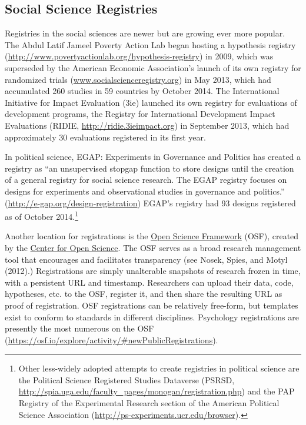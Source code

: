 \documentclass[12pt] {article}
\begin{document}
\subsection{Social Science Registries}\label{social-science-registries}

Registries in the social sciences are newer but are growing ever more
popular. The Abdul Latif Jameel Poverty Action Lab began hosting a
hypothesis registry
(\url{http://www.povertyactionlab.org/hypothesis-registry}) in 2009,
which was superseded by the American Economic Association's launch of
its own registry for randomized trials
(\href{http://www.socialscienceregistry.org}{www.socialscienceregistry.org})
in May 2013, which had accumulated 260 studies in 59 countries by
October 2014. The International Initiative for Impact Evaluation (3ie)
launched its own registry for evaluations of development programs, the
Registry for International Development Impact Evaluations (RIDIE,
\url{http://ridie.3ieimpact.org}) in September 2013, which had
approximately 30 evaluations registered in its first year.

In political science, EGAP: Experiments in Governance and Politics has
created a registry as ``an unsupervised stopgap function to store
designs until the creation of a general registry for social science
research. The EGAP registry focuses on designs for experiments and
observational studies in governance and politics.''
(\url{http://e-gap.org/design-registration}) EGAP's registry had 93
designs registered as of October 2014.\footnote{Other less-widely
  adopted attempts to create registries in political science are the
  Political Science Registered Studies Dataverse (PSRSD,
  \href{../customXml/item1.xml}{http://spia.uga.edu/faculty\_pages/monogan/registration.php})
  and the PAP Registry of the Experimental Research section of the
  American Political Science Association
  (\href{numbering.xml}{http://ps-experiments.ucr.edu/browser}).}

Another location for registrations is the \href{http://osf.io}{Open Science Framework} (OSF), created by the \href{http://centerforopenscience.org/}{Center for Open Science}. The OSF serves as a broad research management tool that encourages and facilitates transparency (see Nosek, Spies, and Motyl (2012).) Registrations are simply unalterable snapshots of research frozen in time, with a persistent URL and timestamp. Researchers can upload their data, code, hypotheses, etc. to the OSF, register it, and then share the resulting URL as proof of registration. OSF registrations can be relatively free-form, but templates exist to conform to standards in different disciplines. Psychology registrations are presently the most numerous on the OSF (\hyperref[newPublicRegistrations]{https://osf.io/explore/activity/\#newPublicRegistrations}).
\end{document}
